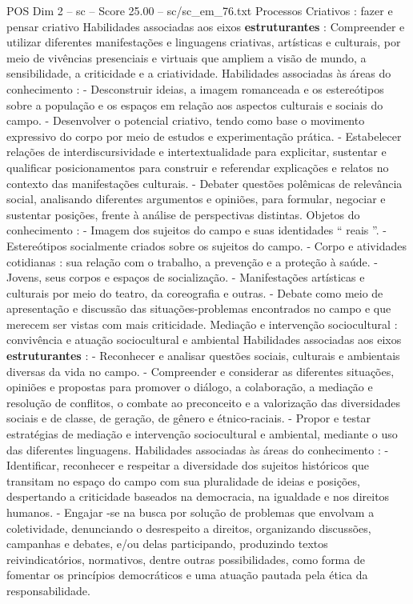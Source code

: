 \begin{textsample}{POS Dim 2 – sc – Score 25.00 – sc/sc\_em\_76.txt}
Processos Criativos : fazer e pensar criativo Habilidades associadas aos eixos \textbf{estruturantes} : Compreender e utilizar diferentes manifestações e linguagens criativas, artísticas e culturais, por meio de vivências presenciais e virtuais que ampliem a visão de mundo, a sensibilidade, a criticidade e a criatividade.
Habilidades associadas às áreas do conhecimento : - Desconstruir ideias, a imagem romanceada e os estereótipos sobre a população e os espaços em relação aos aspectos culturais e sociais do campo. - Desenvolver o potencial criativo, tendo como base o movimento expressivo do corpo por meio de estudos e experimentação prática. - Estabelecer relações de interdiscursividade e intertextualidade para explicitar, sustentar e qualificar posicionamentos para construir e referendar explicações e relatos no contexto das manifestações culturais. - Debater questões polêmicas de relevância social, analisando diferentes argumentos e opiniões, para formular, negociar e sustentar posições, frente à análise de perspectivas distintas.
Objetos do conhecimento : - Imagem dos sujeitos do campo e suas identidades “ reais ”. - Estereótipos socialmente criados sobre os sujeitos do campo. - Corpo e atividades cotidianas : sua relação com o trabalho, a prevenção e a proteção à saúde. - Jovens, seus corpos e espaços de socialização. - Manifestações artísticas e culturais por meio do teatro, da coreografia e outras. - Debate como meio de apresentação e discussão das situações-problemas encontrados no campo e que merecem ser vistas com mais criticidade.
Mediação e intervenção sociocultural : convivência e atuação sociocultural e ambiental Habilidades associadas aos eixos \textbf{estruturantes} : - Reconhecer e analisar questões sociais, culturais e ambientais diversas da vida no campo. - Compreender e considerar as diferentes situações, opiniões e propostas para promover o diálogo, a colaboração, a mediação e resolução de conflitos, o combate ao preconceito e a valorização das diversidades sociais e de classe, de geração, de gênero e étnico-raciais. - Propor e testar estratégias de mediação e intervenção sociocultural e ambiental, mediante o uso das diferentes linguagens.
Habilidades associadas às áreas do conhecimento : - Identificar, reconhecer e respeitar a diversidade dos sujeitos históricos que transitam no espaço do campo com sua pluralidade de ideias e posições, despertando a criticidade baseados na democracia, na igualdade e nos direitos humanos. - Engajar -se na busca por solução de problemas que envolvam a coletividade, denunciando o desrespeito a direitos, organizando discussões, campanhas e debates, e/ou delas participando, produzindo textos reivindicatórios, normativos, dentre outras possibilidades, como forma de fomentar os princípios democráticos e uma atuação pautada pela ética da responsabilidade.

\end{textsample}
